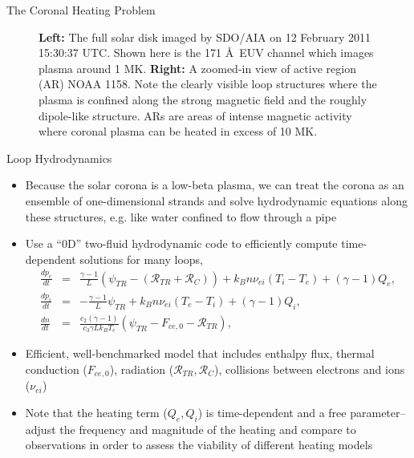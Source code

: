 \documentclass[final]{beamer}
\newcommand{\ang}{\AA~} %
\begin{document}
\begin{frame}
\begin{columns}[T]
\begin{column}{0.49\linewidth}
\begin{block}{The Coronal Heating Problem}
\begin{figure}
\begin{columns}
                \caption{\textbf{Left:} The full solar disk imaged by SDO/AIA on 12 February 2011 15:30:37 UTC. Shown here is the 171 \ang EUV channel which images plasma around 1 MK. \textbf{Right:} A zoomed-in view of active region (AR) NOAA 1158. Note the clearly visible loop structures where the plasma is confined along the strong magnetic field and the roughly dipole-like structure. ARs are areas of intense magnetic activity where coronal plasma can be heated in excess of 10 MK.}
            \end{columns}
        \end{figure}
    \end{block}
    \begin{block}{Loop Hydrodynamics}
    \begin{itemize}
        \item Because the solar corona is a \alert{low-beta} plasma, we can treat the corona as an ensemble of one-dimensional strands and solve hydrodynamic equations along these structures, e.g. like water confined to flow through a pipe 
        \item Use a ``0D'' two-fluid hydrodynamic code \citep{klimchuk_highly_2008,cargill_enthalpy-based_2012,barnes_inference_2016} to efficiently compute time-dependent solutions for \alert{many} loops,
        \begin{eqnarray}
            \frac{dp_e}{dt} &=& \frac{\gamma - 1}{L}(\psi_{TR} - (\mathcal{R}_{TR} + \mathcal{R}_C)) + k_Bn\nu_{ei}(T_i - T_e) + (\gamma - 1)Q_e, \\
            \frac{dp_i}{dt} &=& -\frac{\gamma - 1}{L}\psi_{TR} + k_Bn\nu_{ei}(T_e - T_i) + (\gamma - 1)Q_i, \\
            \frac{dn}{dt} &=& \frac{c_2(\gamma - 1)}{c_3\gamma Lk_BT_e}(\psi_{TR} - F_{ce,0} - \mathcal{R}_{TR}),
        \end{eqnarray}
        \item Efficient, well-benchmarked model \citep[see][]{cargill_enthalpy-based_2012-1,barnes_inference_2016} that includes enthalpy flux, thermal conduction ($F_{ce,0}$), radiation ($\mathcal{R}_{TR},\mathcal{R}_C$), collisions between electrons and ions ($\nu_{ei}$)
        \item Note that the heating term ($Q_e,Q_i$) is time-dependent and a \alert{free parameter}--adjust the frequency and magnitude of the heating and compare to observations in order to assess the viability of different heating models

\end{itemize}
\end{block}
\end{column}
\end{columns}
\end{frame}
\end{document}
